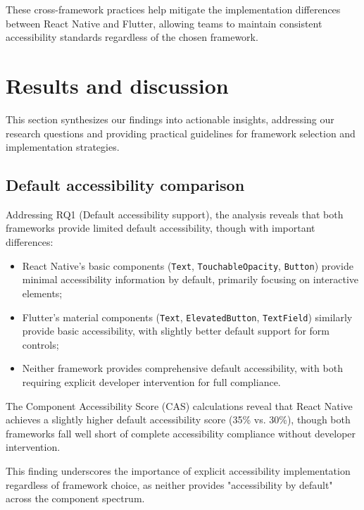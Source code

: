 These cross-framework practices help mitigate the implementation differences between React Native and Flutter, allowing teams to maintain consistent accessibility standards regardless of the chosen framework.

\section{Results and discussion}
\label{sec:results-discussion}

This section synthesizes our findings into actionable insights, addressing our research questions and providing practical guidelines for framework selection and implementation strategies.

\subsection{Default accessibility comparison}
\label{subsec:default-accessibility}

Addressing RQ1 (Default accessibility support), the analysis reveals that both frameworks provide limited default accessibility, though with important differences:

\begin{itemize}
    \item React Native's basic components (\texttt{Text}, \texttt{TouchableOpacity}, \texttt{Button}) provide minimal accessibility information by default, primarily focusing on interactive elements;
    
    \item Flutter's material components (\texttt{Text}, \texttt{ElevatedButton}, \texttt{TextField}) similarly provide basic accessibility, with slightly better default support for form controls;
    
    \item Neither framework provides comprehensive default accessibility, with both requiring explicit developer intervention for full compliance.
\end{itemize}

The Component Accessibility Score (CAS) calculations reveal that React Native achieves a slightly higher default accessibility score (35\% vs. 30\%), though both frameworks fall well short of complete accessibility compliance without developer intervention.

This finding underscores the importance of explicit accessibility implementation regardless of framework choice, as neither provides "accessibility by default" across the component spectrum.

